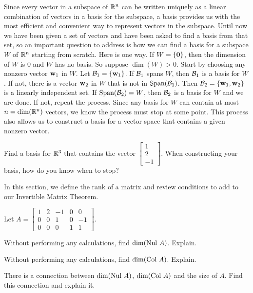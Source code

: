 
Since every vector in a subspace of $\mathbb{R}^n$ can be written uniquely as a linear combination of vectors in a basis for the subspace, a basis provides us with the most efficient and convenient way to represent vectors in the subspace. Until now we have been given a set of vectors and have been asked to find a basis from that set, so an important question to address is how we can find a basis for a subspace $W$ of $\mathbb{R}^n$ starting from scratch. Here is one way. If $W = \{\mathbf{0}\}$, then the dimension of $W$ is 0 and $W$ has no basis. So suppose $\dim(W) > 0$. Start by choosing any nonzero vector $\mathbf{w}_1$ in $W$. Let $\mathcal{B}_1 = \{\mathbf{w}_1\}$. If $\mathcal{B}_1$ spans $W$, then $\mathcal{B}_1$ is a basis for $W$. If not, there is a vector $\mathbf{w}_2$ in $W$ that is not in $\text{Span}(\mathcal{B}_1)$. Then $\mathcal{B}_2 = \{\mathbf{w}_1, \mathbf{w}_2\}$ is a linearly independent set. If $\text{Span}(\mathcal{B}_2) = W$, then $\mathcal{B}_2$ is a basis for $W$ and we are done. If not, repeat the process. Since any basis for $W$ can contain at most $n=\dim(\mathbb{R}^n)$ vectors, we know the process must stop at some point. This process also allows us to construct a basis for a vector space that contains a given nonzero vector. 



\begin{activity} \label{act:3_d_4} Find a basis for $\mathbb{R}^3$ that contains the vector $\left[ \begin{array}{r} 1 \\ 2 \\ -1 \end{array} \right]$. When constructing your basis, how do you know when to stop? 


\end{activity}



In this section, we define the rank of a matrix and review conditions to add to our Invertible Matrix Theorem.



\begin{activity} \label{act:3_d_5} Let $A = \left[ \begin{array}{rrrrr} 1&2&-1&0&0 \\ 0&0&1&0&-1 \\ 0&0&0&1&1 \end{array} \right]$.
\ba
\item Without performing any calculations, find $\dim(\text{Nul } A)$. Explain.



\item Without performing any calculations, find $\dim(\text{Col } A)$. Explain.



\item There is a connection between $\dim(\text{Nul } A)$, $\dim(\text{Col } A)$ and the size of $A$. Find this connection and explain it.



\ea

\end{activity}




